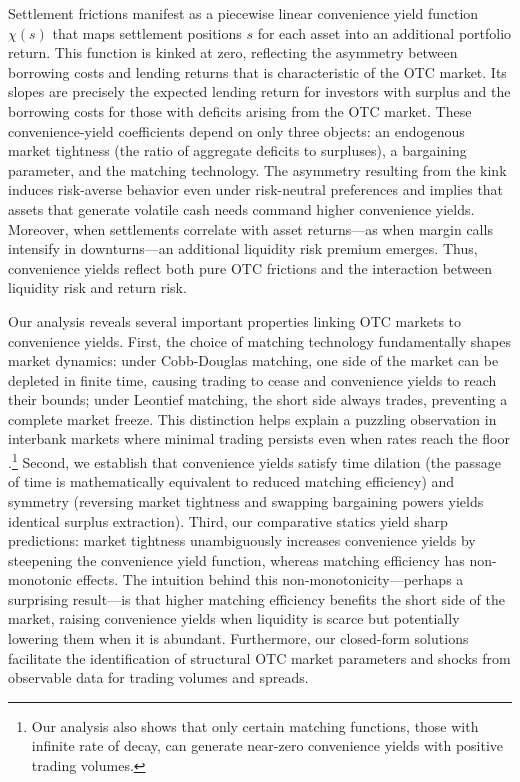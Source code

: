 \documentclass[12pt,american,english,notitlepage]{article}
\begin{document}
Settlement frictions manifest
as a piecewise linear convenience yield function $\chi\left(s\right)$
that maps settlement positions $s$ for each asset into an additional portfolio return. This function is kinked at zero, reflecting the asymmetry
between borrowing costs and lending returns that is characteristic of the OTC market.
Its slopes are precisely the expected lending return for investors
with surplus and the borrowing costs for those with deficits arising from the OTC market. These convenience-yield coefficients depend
on only three objects: an endogenous market tightness (the ratio of
aggregate deficits to surpluses), a bargaining parameter, and the
matching technology. The asymmetry resulting from the kink induces risk-averse behavior even under risk-neutral preferences and implies that assets that generate volatile cash needs command higher
convenience yields. Moreover, when settlements
correlate with asset returns---as when margin calls intensify
in downturns---an additional liquidity risk premium emerges. Thus,
convenience yields reflect both pure OTC frictions and the interaction
between liquidity risk and return risk. 

Our analysis reveals several important properties linking OTC markets
to convenience yields. First, the choice of matching technology fundamentally shapes market dynamics: under Cobb-Douglas matching, one side of the market can be depleted in finite time, causing trading to cease and convenience yields to reach their bounds; under Leontief matching, the short side always trades, preventing a complete market freeze. This distinction helps explain a puzzling observation in interbank markets where minimal trading persists even when rates reach the floor \citep[e.g., see][]{LopesSalidosVissingJorgenson,AfonsoGiannoneLaSpadaWilliams,LagosNavarro2023}.\footnote{Our analysis also shows that only certain matching functions, those with infinite rate of decay, can generate near-zero convenience yields with positive trading volumes.} Second, we establish that convenience yields satisfy time dilation (the passage of time is mathematically equivalent
to reduced matching efficiency) and symmetry (reversing market tightness and swapping bargaining powers yields identical surplus extraction). Third, our comparative statics yield sharp predictions: market tightness unambiguously increases convenience yields by steepening the convenience yield function, whereas matching efficiency has non-monotonic effects. The intuition behind this non-monotonicity---perhaps a surprising result---is that higher matching efficiency benefits the short side of the market, raising convenience yields when liquidity is scarce but potentially lowering them when it is abundant. Furthermore, our closed-form solutions facilitate the identification of structural OTC market parameters and shocks from observable data for trading volumes and spreads. 
\end{document}

